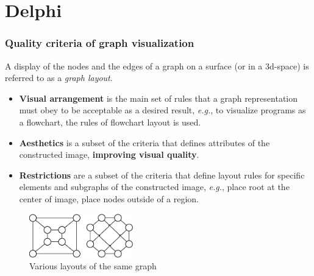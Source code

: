 \documentclass{beamer}
\begin{document}
\section{Delphi}
\begin{frame}
\frametitle{Quality criteria of graph visualization}

A display of the nodes and the edges of a graph on a surface (or in a 3d-space) is referred to as a \emph{graph layout}.

	\begin{itemize}
\item \textbf{Visual arrangement} is the main set of rules that a graph representation must obey to be acceptable as a desired result, \textit{e.g.}, to visualize programs as a flowchart, the rules of flowchart layout is used.
\item \textbf{Aesthetics} is a subset of the criteria that defines attributes of the constructed image, \textbf{improving visual quality}.
\item \textbf{Restrictions} are a subset of the criteria that define layout rules for specific elements and subgraphs of the constructed image, \textit{e.g.}, place root at the center of image, place nodes outside of a region.
\end{itemize}
	\begin{figure}[htbp]
		\centering
			\includegraphics[width=0.40\textwidth]{Pic/Pic1.eps}
                \caption{Various layouts of the same graph}
		\label{fig:VisExample}
	\end{figure}
\end{frame}

\end{document}
